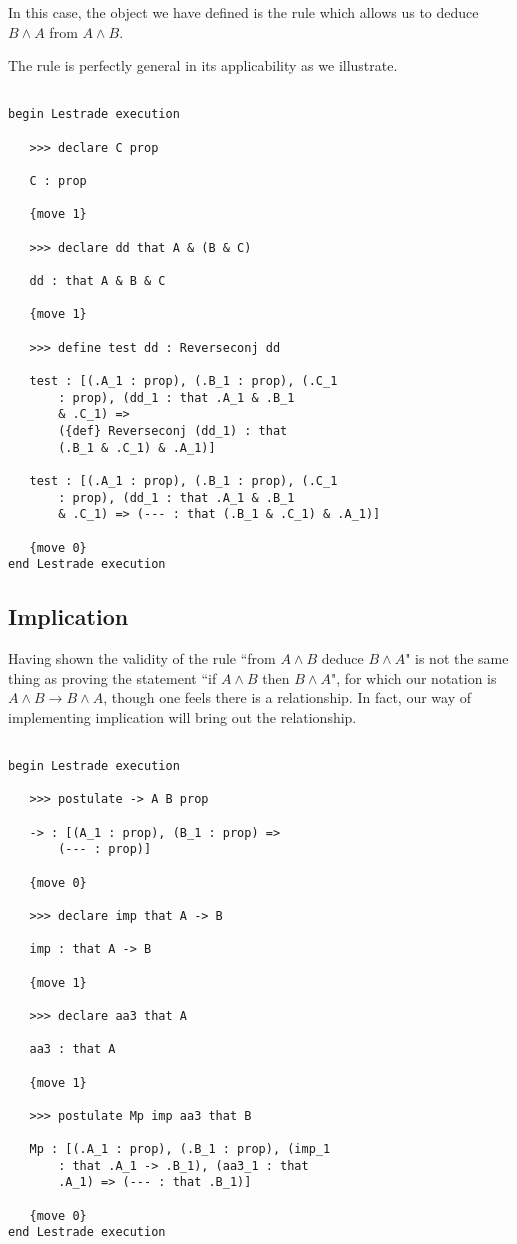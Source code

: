 \documentclass[12pt]{article}
\begin{document}
In this case, the object we have defined is the rule which allows us to deduce $B \wedge A$ from $A \wedge B$.

The rule is perfectly general in its applicability as we illustrate.

\begin{verbatim}

begin Lestrade execution

   >>> declare C prop

   C : prop

   {move 1}

   >>> declare dd that A & (B & C)

   dd : that A & B & C

   {move 1}

   >>> define test dd : Reverseconj dd

   test : [(.A_1 : prop), (.B_1 : prop), (.C_1 
       : prop), (dd_1 : that .A_1 & .B_1 
       & .C_1) => 
       ({def} Reverseconj (dd_1) : that 
       (.B_1 & .C_1) & .A_1)]

   test : [(.A_1 : prop), (.B_1 : prop), (.C_1 
       : prop), (dd_1 : that .A_1 & .B_1 
       & .C_1) => (--- : that (.B_1 & .C_1) & .A_1)]

   {move 0}
end Lestrade execution

\end{verbatim}

\newpage

\subsection{Implication}

Having shown the validity of the rule ``from $A \wedge B$ deduce $B \wedge A$" is not the same thing as proving the
statement ``if $A \wedge B$ then $B \wedge A$", for which our notation is $A \wedge B \rightarrow B \wedge A$, though one feels there is a relationship.  In fact, our way of implementing implication will bring out the relationship.

\begin{verbatim}

begin Lestrade execution

   >>> postulate -> A B prop

   -> : [(A_1 : prop), (B_1 : prop) => 
       (--- : prop)]

   {move 0}

   >>> declare imp that A -> B

   imp : that A -> B

   {move 1}

   >>> declare aa3 that A

   aa3 : that A

   {move 1}

   >>> postulate Mp imp aa3 that B

   Mp : [(.A_1 : prop), (.B_1 : prop), (imp_1 
       : that .A_1 -> .B_1), (aa3_1 : that 
       .A_1) => (--- : that .B_1)]

   {move 0}
end Lestrade execution

\end{verbatim}
\end{document}
